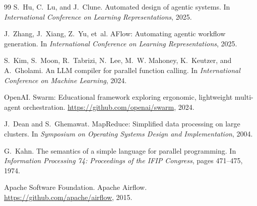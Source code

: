 \documentclass[11pt]{article}
\begin{document}
\begin{thebibliography}{99}
S.~Hu, C.~Lu, and J.~Clune.
\newblock Automated design of agentic systems.
\newblock In \emph{International Conference on Learning Representations}, 2025.

J.~Zhang, J.~Xiang, Z.~Yu, et~al.
\newblock AFlow: Automating agentic workflow generation.
\newblock In \emph{International Conference on Learning Representations}, 2025.

S.~Kim, S.~Moon, R.~Tabrizi, N.~Lee, M.~W. Mahoney, K.~Keutzer, and A.~Gholami.
\newblock An LLM compiler for parallel function calling.
\newblock In \emph{International Conference on Machine Learning}, 2024.

OpenAI.
\newblock Swarm: Educational framework exploring ergonomic, lightweight multi-agent orchestration.
\newblock \url{https://github.com/openai/swarm}, 2024.

J.~Dean and S.~Ghemawat.
\newblock MapReduce: Simplified data processing on large clusters.
\newblock In \emph{Symposium on Operating Systems Design and Implementation}, 2004.

G.~Kahn.
\newblock The semantics of a simple language for parallel programming.
\newblock In \emph{Information Processing 74: Proceedings of the IFIP Congress}, pages 471--475, 1974.

Apache Software Foundation.
\newblock Apache Airflow.
\newblock \url{https://github.com/apache/airflow}, 2015.

\end{thebibliography}
\end{document}
